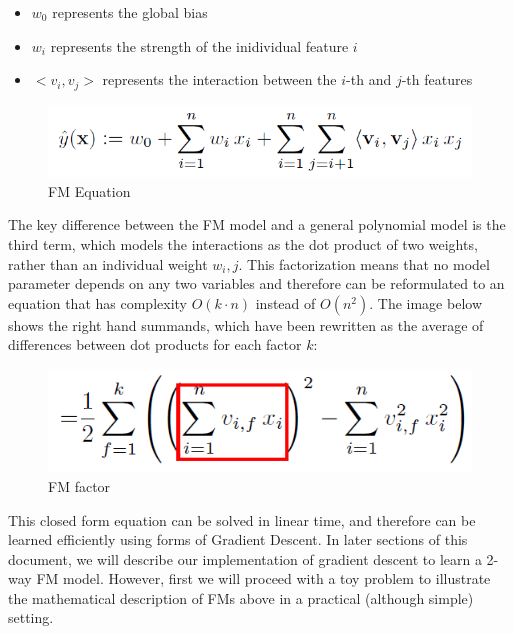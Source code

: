 \documentclass[11pt]{article}
\makeatletter
\def\maxwidth{\ifdim\Gin@nat@width>\linewidth\linewidth
    \else\Gin@nat@width\fi}
\let\Oldincludegraphics\includegraphics
\renewcommand{\includegraphics}[1]{\Oldincludegraphics[width=.8\maxwidth]{#1}}
\providecommand{\tightlist}{%
      \setlength{\itemsep}{0pt}\setlength{\parskip}{0pt}}
\makeatother
\begin{document}
\begin{itemize}
\tightlist
\item
  \(w_0\) represents the global bias
\item
  \(w_i\) represents the strength of the inidividual feature \(i\)
\item
  \(<v_i,v_j>\) represents the interaction between the \(i\)-th and
  \(j\)-th features
\end{itemize}

    \begin{figure}
\centering
\includegraphics{FINAL/images/FM_equation_Rendle2010.png}
\caption{FM Equation}
\end{figure}

    The key difference between the FM model and a general polynomial model
is the third term, which models the interactions as the dot product of
two weights, rather than an individual weight \(w_i,j\). This
factorization means that no model parameter depends on any two variables
and therefore can be reformulated to an equation that has complexity
\(O(k\cdot n)\) instead of \(O(n^2)\). The image below shows the right
hand summands, which have been rewritten as the average of differences
between dot products for each factor \(k\):

    \begin{figure}
\centering
\includegraphics{FINAL/images/FM_factor_Rendle2010.png}
\caption{FM factor}
\end{figure}

    This closed form equation can be solved in linear time, and therefore
can be learned efficiently using forms of Gradient Descent. In later
sections of this document, we will describe our implementation of
gradient descent to learn a 2-way FM model. However, first we will
proceed with a toy problem to illustrate the mathematical description of
FMs above in a practical (although simple) setting.
\end{document}
